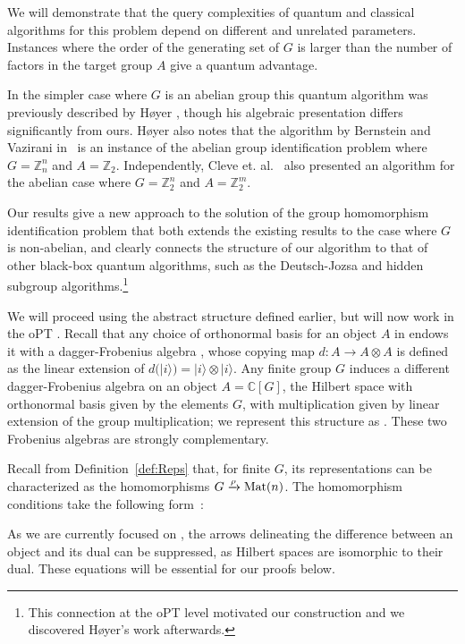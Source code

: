 \noindent
We will demonstrate that the query complexities of quantum and classical algorithms for this problem depend on different and unrelated parameters. Instances where the order of the generating set of $G$ is larger than the number of factors in the target group $A$ give a quantum advantage. 

In  the simpler case where $G$ is an abelian group this quantum algorithm was previously described by H\o yer \cite{hoyer1999conjugated}, though his algebraic presentation differs significantly from ours. H\o yer also notes that the algorithm by Bernstein and Vazirani in~\cite{bernstein1993quantum} is an instance of the abelian group identification problem where $G=\mathbb{Z}_n^n$ and $A=\mathbb{Z}_2$. Independently, Cleve et. al.~\cite{cleve1998quantum} also presented an algorithm for the abelian case where $G=\mathbb{Z}_2^n$ and $A=\mathbb{Z}_2^m$.

Our results give a new approach to the solution of the group homomorphism identification problem that both extends the existing results to the case where $G$ is non-abelian, and clearly connects the structure of our algorithm to that of other black-box quantum algorithms, such as the Deutsch-Jozsa and hidden subgroup algorithms.\footnote{ This connection at the oPT level motivated our construction and we discovered H\o yer's work afterwards.}

We will proceed using the abstract structure defined earlier, but will now work in the oPT . Recall that any choice of orthonormal basis for  an object $A$ in  endows it with a dagger-Frobenius algebra , whose copying map $d: A \to A\otimes A$ is defined as the linear extension of $d(|i\rangle)=|i\rangle\otimes|i\rangle$. Any finite group $G$ induces a different dagger-Frobenius algebra on an object $A=\mathbb{C}[G]$, the Hilbert space with orthonormal basis given by the elements $G$, with multiplication given by linear extension of the group multiplication; we represent this structure as . These two Frobenius algebras are strongly complementary.

\def\Mat{\mathrm{Mat}}
Recall from Definition~\ref{def:Reps} that, for finite $G$, its representations can be characterized as the homomorphisms \mbox{$G \xrightarrow{\smash{\rho}} \mbox{Mat}(n)$}. The homomorphism conditions take the following form~\cite[Section~A.7]{vicary-tqa}:
\begin{calign}
\label{eq:rhocopied}

\end{calign}
As we are currently focused on , the arrows delineating the difference between an object and its dual can be suppressed, as Hilbert spaces are isomorphic to their dual. These equations will be essential for our proofs below.

